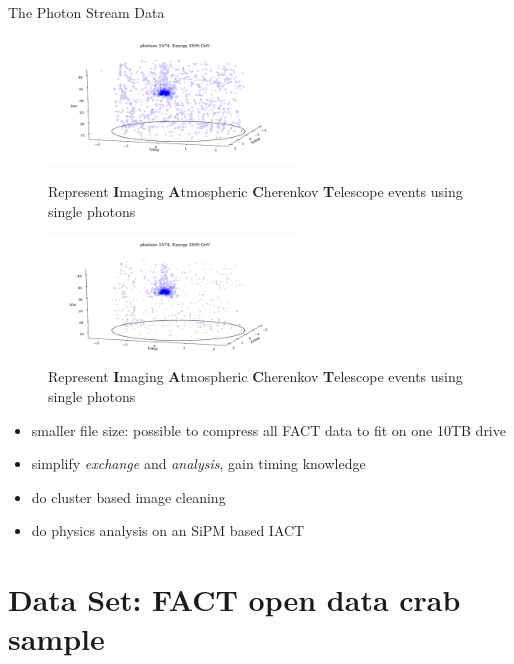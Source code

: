 \begin{frame}[t]{The Photon Stream Data}
    \begin{multicols}{2}
    \begin{figure}
        \centering
        \begin{overprint}
            \includegraphics[width=0.6\textwidth]{fig/event/example_event_small-14.png}
            \caption{Represent \textbf{I}maging \textbf{A}tmospheric \textbf{C}herenkov \textbf{T}elescope events using single photons}
            \includegraphics[width=0.6\textwidth]{fig/event/example_event_small-15.png}
            \caption{Represent \textbf{I}maging \textbf{A}tmospheric \textbf{C}herenkov \textbf{T}elescope events using single photons}
    \end{overprint}
    \end{figure}
    \columnbreak
    \begin{itemize}
        \item smaller file size: possible to compress all FACT data to fit on one 10TB drive
        \item simplify \textit{exchange} and \textit{analysis}, gain timing knowledge
        \item do cluster based image cleaning
        \item do physics analysis on an SiPM based IACT
    \end{itemize}
    \end{multicols}
\end{frame}



\section{Data Set: FACT open data crab sample}

